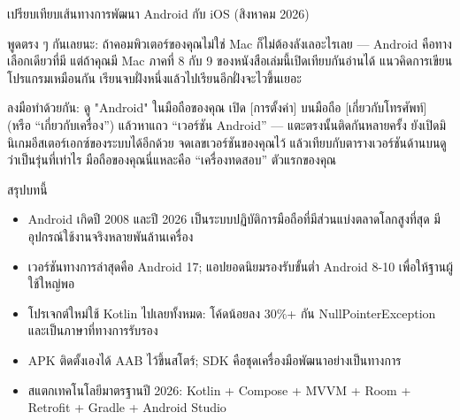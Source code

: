 \begin{center}\small\color{gray}เปรียบเทียบเส้นทางการพัฒนา Android กับ iOS (สิงหาคม 2026)\end{center}

พูดตรง ๆ กันเลยนะ: ถ้าคอมพิวเตอร์ของคุณไม่ใช่ Mac ก็ไม่ต้องลังเลอะไรเลย — Android คือทางเลือกเดียวที่มี แต่ถ้าคุณมี Mac ภาคที่ 8 กับ 9 ของหนังสือเล่มนี้เปิดเทียบกันอ่านได้ แนวคิดการเขียนโปรแกรมเหมือนกัน เรียนจบฝั่งหนึ่งแล้วไปเรียนอีกฝั่งจะไวขึ้นเยอะ

\begin{tcbpractice}{ลงมือทำด้วยกัน: ดู "Android" ในมือถือของคุณ}
เปิด [การตั้งค่า] บนมือถือ [เกี่ยวกับโทรศัพท์] (หรือ “เกี่ยวกับเครื่อง”) แล้วหาแถว “เวอร์ชัน Android” — แตะตรงนั้นติดกันหลายครั้ง ยังเปิดมินิเกมอีสเตอร์เอกซ์ของระบบได้อีกด้วย จดเลขเวอร์ชันของคุณไว้ แล้วเทียบกับตารางเวอร์ชันด้านบนดูว่าเป็นรุ่นที่เท่าไร มือถือของคุณนี่แหละคือ “เครื่องทดสอบ” ตัวแรกของคุณ

\end{tcbpractice}

\begin{tcbsummary}{สรุปบทนี้}
\begin{itemize}
  \item Android เกิดปี 2008 และปี 2026 เป็นระบบปฏิบัติการมือถือที่มีส่วนแบ่งตลาดโลกสูงที่สุด มีอุปกรณ์ใช้งานจริงหลายพันล้านเครื่อง
  \item เวอร์ชันทางการล่าสุดคือ Android 17; แอปยอดนิยมรองรับขั้นต่ำ Android 8-10 เพื่อให้ฐานผู้ใช้ใหญ่พอ
  \item โปรเจกต์ใหม่ใช้ Kotlin ไปเลยทั้งหมด: โค้ดน้อยลง 30\%+ กัน NullPointerException และเป็นภาษาที่ทางการรับรอง
  \item APK ติดตั้งเองได้ AAB ไว้ขึ้นสโตร์; SDK คือชุดเครื่องมือพัฒนาอย่างเป็นทางการ
  \item สแตกเทคโนโลยีมาตรฐานปี 2026: Kotlin + Compose + MVVM + Room + Retrofit + Gradle + Android Studio
\end{itemize}

\end{tcbsummary}
